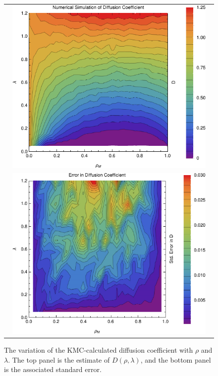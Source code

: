\begin{figure} \caption[The variation of the KMC-calculated diffusion coefficient with $\rho$ and 
$\lambda$.]{The variation of the KMC-calculated diffusion coefficient with $\rho$ and 
$\lambda$. The top panel is the estimate of $D(\rho, \lambda)$, and the bottom panel is the associated
standard error.} 
\label{fig:KMCDiffCoeff}
\begin{center}
\begin{tabular}{c}
\includegraphics[width=0.95\textwidth]{numerics/images/diffCoeff/numDiffCoeff} \\
\includegraphics[width=0.95\textwidth]{numerics/images/diffCoeff/newFlowErr} \\
\end{tabular}
\end{center}
\end{figure}

